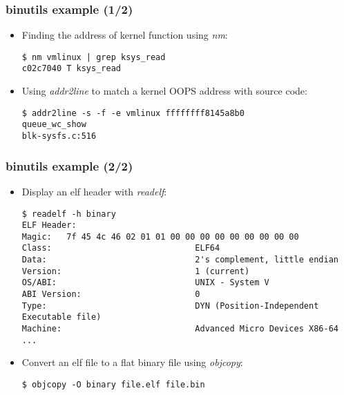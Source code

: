 \begin{frame}[fragile]
  \frametitle{binutils example (1/2)}
  \begin{itemize}
    \item Finding the address of  kernel function using {\em nm}:
    \begin{block}{}
      \begin{verbatim}
$ nm vmlinux | grep ksys_read
c02c7040 T ksys_read
      \end{verbatim}
    \end{block}

    \item Using {\em addr2line} to match a kernel OOPS address with source code:
    \begin{block}{}
      \begin{verbatim}
$ addr2line -s -f -e vmlinux ffffffff8145a8b0
queue_wc_show
blk-sysfs.c:516
      \end{verbatim}
    \end{block}
  \end{itemize}
\end{frame}

\begin{frame}[fragile]
  \frametitle{binutils example (2/2)}
  \begin{itemize}
    \item Display an elf header with {\em readelf}:
    \begin{block}{}
      \begin{verbatim}
$ readelf -h binary
ELF Header:
Magic:   7f 45 4c 46 02 01 01 00 00 00 00 00 00 00 00 00
Class:                             ELF64
Data:                              2's complement, little endian
Version:                           1 (current)
OS/ABI:                            UNIX - System V
ABI Version:                       0
Type:                              DYN (Position-Independent Executable file)
Machine:                           Advanced Micro Devices X86-64
...
      \end{verbatim}
    \end{block}

    \item Convert an elf file to a flat binary file using {\em objcopy}:
    \begin{block}{}
      \begin{verbatim}
$ objcopy -O binary file.elf file.bin
      \end{verbatim}
    \end{block}
  \end{itemize}
\end{frame}


